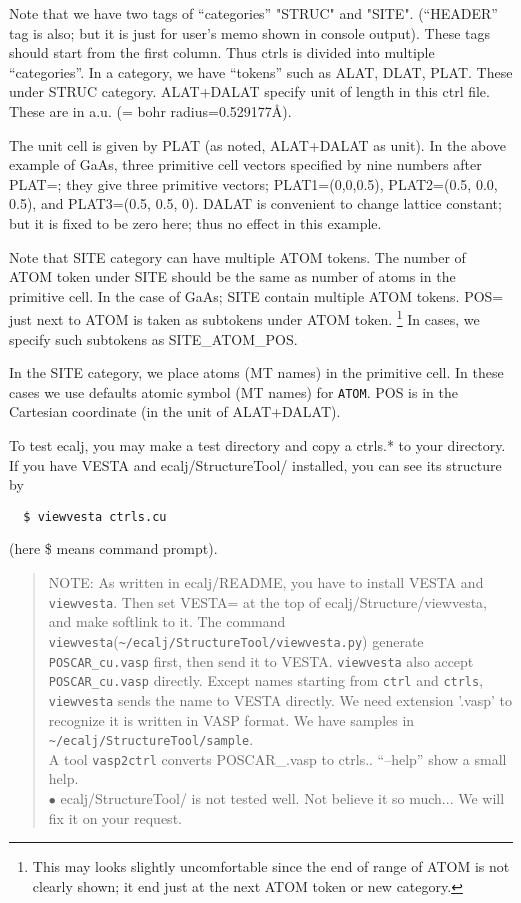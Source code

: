 \documentclass[a4paper,10pt,epsf,fleqn]{article}
\begin{document}
Note that we have two tags of ``categories'' "STRUC" and "SITE". 
(``HEADER'' tag is also; but it is just for user's memo shown in console output).
These tags should start from the first column. 
Thus ctrls is divided into multiple ``categories''.
In a category, we have ``tokens'' such as ALAT, DLAT, PLAT. 
These under STRUC category. 
ALAT+DALAT specify unit of length in this ctrl file.
These are in a.u. (= bohr radius=0.529177\AA). 

The unit cell is given by PLAT (as noted, ALAT+DALAT as unit).
In the above example of GaAs, three primitive cell vectors specified by nine
numbers after PLAT=; they give three primitive vectors;
PLAT1=(0,0,0.5), PLAT2=(0.5, 0.0, 0.5), and PLAT3=(0.5, 0.5, 0). 
DALAT is convenient to change lattice constant; but it is fixed to be
zero here; thus no effect in this example.

Note that SITE category can have multiple ATOM tokens. The number of
ATOM token under SITE should be the same as number of atoms in the primitive cell.
In the case of GaAs; SITE contain multiple ATOM tokens.
POS= just next to ATOM is taken as subtokens under ATOM token. 
\footnote{This may looks slightly uncomfortable since the end of range of ATOM
 is not clearly shown; it end just at the next ATOM token or new category.}
In cases, we specify such subtokens as SITE\_ATOM\_POS.

In the SITE category, we place atoms (MT names) in the primitive cell.
In these cases we use defaults atomic symbol (MT names) for \verb+ATOM+.
POS is in the Cartesian coordinate (in the unit of ALAT+DALAT).

To test ecalj, you may make a test directory and copy a ctrls.* to your directory.
If you have VESTA and ecalj/StructureTool/ installed, you can see its structure by 
\begin{verbatim}
  $ viewvesta ctrls.cu
\end{verbatim}
(here \$ means command prompt).
\begin{quote}
NOTE: As written in ecalj/README, you have to install VESTA and \verb+viewvesta+. 
Then set VESTA= at the top of ecalj/Structure/viewvesta, and make softlink to it.
The command \verb+viewvesta+(\verb+~/ecalj/StructureTool/viewvesta.py+)
generate \verb+POSCAR_cu.vasp+ first, then send it to VESTA.
\verb+viewvesta+ also accept \verb+POSCAR_cu.vasp+ directly.
Except names starting from \verb+ctrl+ and \verb+ctrls+,
\verb+viewvesta+ sends the name to VESTA directly. 
We need extension '.vasp' to recognize it is written in VASP format.
We have samples in \verb+~/ecalj/StructureTool/sample+.\\
A tool \verb+vasp2ctrl+ converts POSCAR\_\*.vasp to ctrls.\*.
``--help'' show a small help. \\
$\bullet$ ecalj/StructureTool/ is not tested well. Not believe it so
much... We will fix it on your request.
\end{quote}
\end{document}
